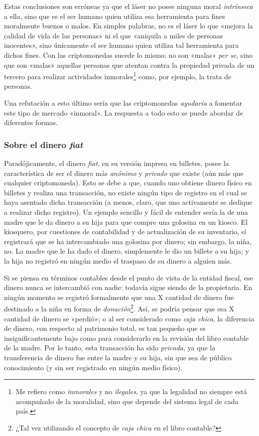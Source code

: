 \documentclass[12pt,a4paper,twoside]{book}
\begin{document}
Estas conclusiones son erróneas ya que el láser no posee ninguna moral \textit{intrínseca} a ella, sino que es el ser humano quien utiliza esa herramienta para fines moralmente buenos o malos. En simples palabras, no es el láser lo que «mejora la calidad de vida de las personas» ni el que «aniquila a miles de personas inocentes», sino únicamente el ser humano quien utiliza tal herramienta para dichos fines. Con las criptomonedas sucede lo mismo: no son «malas» \textit{per se}, sino que son «malas» aquellas personas que atentan contra la propiedad privada de un tercero para realizar actividades inmorales\footnote{Me refiero como \textit{inmorales} y no \textit{ilegales}, ya que la legalidad no siempre está acompañado de la moralidad, sino que depende del sistema legal de cada país.} como, por ejemplo, la trata de personas.

Una refutación a esto último sería que las criptomonedas \textit{ayudaría} a fomentar este tipo de mercado «inmoral». La respuesta a todo esto se puede abordar de diferentes formas.

\subsubsection{Sobre el dinero \textit{fiat}}
Paradójicamente, el dinero \textit{fiat}, en su versión impresa en billetes, posee la característica de ser el dinero más \textit{anónimo} y \textit{privado} que existe (aún más que cualquier criptomoneda). Esto se debe a que, cuando uno obtiene dinero físico en billetes y realiza una transacción, no existe ningún tipo de registro en el cual se haya asentado dicha transacción (a menos, claro, que uno activamente se dedique a realizar dicho registro). Un ejemplo sencillo y fácil de entender sería la de una madre que le da dinero a su hija para que compre una golosina en un kiosco. El kiosquero, por cuestiones de contabilidad y de actualización de su inventario, sí registrará que se ha intercambiado una golosina por dinero; sin embargo, la niña, no. La madre que le ha dado el dinero, simplemente le dio un billete a su hija; y la hija no registró en ningún medio el traspaso de su dinero a alguien más.

Si se piensa en términos contables desde el punto de vista de la entidad fiscal, ese dinero nunca se intercambió con nadie: todavía sigue siendo de la propietaria. En ningún momento se registró formalmente que una X cantidad de dinero fue destinado a la niña en forma de \textit{donación}\footnote{¿Tal vez utilizando el concepto de \textit{caja chica} en el libro contable?}. Así, se podría pensar que esa X cantidad de dinero se «perdió»; o al ser considerado como \textit{caja chica}, la diferencia de dinero, con respecto al patrimonio total, es tan pequeño que es insignificantemente bajo como para considerarlo en la revisión del libro contable de la madre. Por lo tanto, esta transacción ha sido \textit{privada}, ya que la transferencia de dinero fue entre la madre y su hija, sin que sea de público conocimiento (y sin ser registrado en ningún medio físico).
\end{document}
